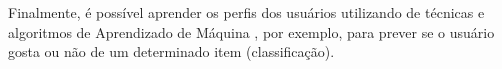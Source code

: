 \documentclass[
    12pt,                %
    oneside,            %
    a4paper,            %
    english,            %
    brazil                %
    ]{abntex2ppgsi}
\begin{document}



Finalmente, é possível aprender os perfis dos usuários utilizando de técnicas e algoritmos de Aprendizado de Máquina \cite{Adomavicius2005,Lops2011,Jannach2011}, por exemplo, para prever se o usuário gosta ou não de um determinado item (classificação).

\end{document}
